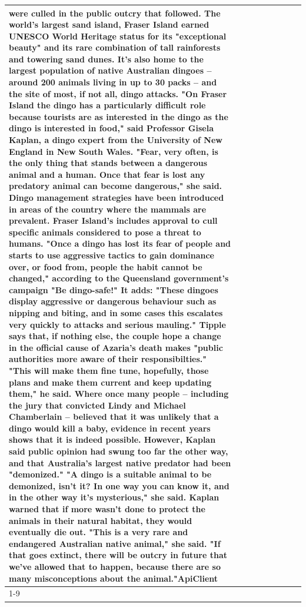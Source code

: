 \begin{table}[H]
\begin{tabular}{lllrlllll}
were culled in the public outcry that followed. The world's largest sand island, Fraser Island earned UNESCO World Heritage status for its "exceptional beauty" and its rare combination of tall rainforests and towering sand dunes. It's also home to the largest population of native Australian dingoes -- around 200 animals living in up to 30 packs -- and the site of most, if not all, dingo attacks. "On Fraser Island the dingo has a particularly difficult role because tourists are as interested in the dingo as the dingo is interested in food," said Professor Gisela Kaplan, a dingo expert from the University of New England in New South Wales. "Fear, very often, is the only thing that stands between a dangerous animal and a human. Once that fear is lost any predatory animal can become dangerous," she said. Dingo management strategies have been introduced in areas of the country where the mammals are prevalent. Fraser Island's includes approval to cull specific animals considered to pose a threat to humans. "Once a dingo has lost its fear of people and starts to use aggressive tactics to gain dominance over, or food from, people the habit cannot be changed," according to the Queensland government's campaign "Be dingo-safe!" It adds: "These dingoes display aggressive or dangerous behaviour such as nipping and biting, and in some cases this escalates very quickly to attacks and serious mauling." Tipple says that, if nothing else, the couple hope a change in the official cause of Azaria's death makes "public authorities more aware of their responsibilties." "This will make them fine tune, hopefully, those plans and make them current and keep updating them," he said. Where once many people -- including the jury that convicted Lindy and Michael Chamberlain -- believed that it was unlikely that a dingo would kill a baby, evidence in recent years shows that it is indeed possible. However, Kaplan said public opinion had swung too far the other way, and that Australia's largest native predator had been "demonized." "A dingo is a suitable animal to be demonized, isn't it? In one way you can know it, and in the other way it's mysterious," she said. Kaplan warned that if more wasn't done to protect the animals in their natural habitat, they would eventually die out. "This is a very rare and endangered Australian native animal," she said. "If that goes extinct, there will be outcry in future that we've allowed that to happen, because there are so many misconceptions about the animal."ApiClient \\
\cline{1-9}

\end{tabular}
\end{table}
